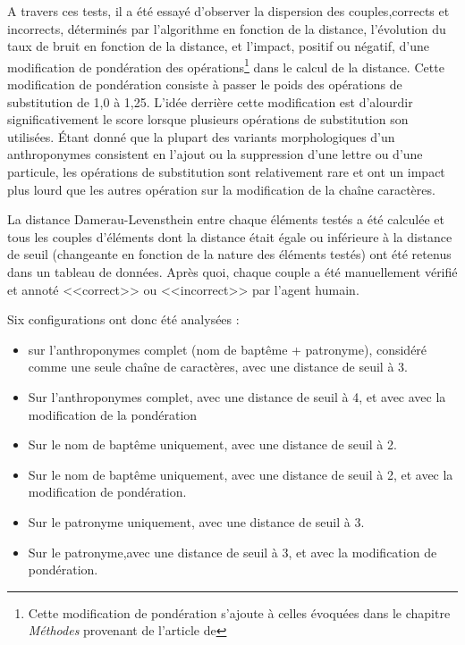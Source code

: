 A travers ces tests, il a été essayé d'observer la dispersion des couples,corrects et incorrects, déterminés par l'algorithme en fonction de la distance, l'évolution du taux de bruit en fonction de la distance, et l'impact, positif ou négatif, d'une modification de pondération des opérations\footnote{Cette modification de pondération s'ajoute à celles évoquées dans le chapitre \textit{Méthodes} provenant de l'article de } dans le calcul de la distance.
Cette modification de pondération consiste à passer le poids des opérations de substitution de 1,0 à 1,25. 
L'idée derrière cette modification est d'alourdir significativement le score lorsque plusieurs opérations de substitution son utilisées. 
Étant donné que la plupart des variants morphologiques d'un anthroponymes consistent en l'ajout ou la suppression d'une lettre ou d'une particule, les opérations de substitution sont relativement rare et ont un impact plus lourd que les autres opération sur la modification de la chaîne caractères.

La distance Damerau-Levensthein  entre chaque éléments testés a été calculée et tous les couples d'éléments dont la distance était égale ou inférieure à la distance de seuil (changeante en fonction de la nature des éléments testés) ont été retenus dans un tableau de données. Après quoi, chaque couple a été manuellement vérifié et annoté <<correct>> ou <<incorrect>> par l'agent humain.

Six configurations ont donc été analysées :
\begin{itemize}
    \item sur l'anthroponymes complet (nom de baptême + patronyme), considéré comme une seule chaîne de caractères, avec une distance de seuil à 3.
    \item Sur l'anthroponymes complet, avec une distance de seuil à 4, et avec avec la modification de la pondération
    \item Sur le nom de baptême uniquement, avec une distance de seuil à 2.
    \item Sur le nom de baptême uniquement, avec une distance de seuil à 2, et avec la modification de pondération.
    \item Sur le patronyme uniquement, avec une distance de seuil à 3.
    \item Sur le patronyme,avec une distance de seuil à 3, et avec la modification de pondération.
\end{itemize}

